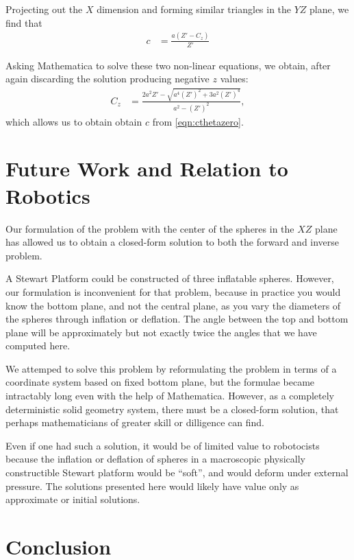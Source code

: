 \documentclass{article}
\begin{document}
Projecting out the $X$ dimension and forming
similar triangles in the $YZ$ plane, we find that
\begin{align}
  c &= \frac{a( Z' -C_z )}{Z'} \label{eqn:cthetazero}
\end{align}

Asking Mathematica to solve these two non-linear equations, we obtain,
after again discarding the solution producing negative $z$ values:
\begin{align}
 C_z &=  \frac{2 a^2 Z' - \sqrt{a^4 (Z')^2 + 3 a^2 (Z')^4}}{a^2 - (Z')^2},
\end{align}
which allows us to obtain obtain $c$ from \ref{eqn:cthetazero}.

\section{Future Work and Relation to Robotics}

Our formulation of the problem with the center of the spheres in the $XZ$
plane has allowed us to obtain a closed-form solution to both the forward
and inverse problem.

A Stewart Platform could be constructed of three inflatable spheres.
However, our formulation is inconvenient for that problem, because
in practice you would know the bottom plane, and not the central plane,
as you vary the diameters of the spheres through inflation or deflation.
The angle between the top and bottom plane will be approximately but not
exactly twice the angles that we have computed here.

We attemped to solve this problem by reformulating the problem in terms
of a coordinate system based on fixed bottom plane, but
the formulae became intractably long even with the help of Mathematica.
However, as a completely deterministic solid geometry system, there
must be a closed-form solution, that perhaps mathematicians of greater
skill or dilligence can find.

Even if one had such a solution, it would be of limited value
to robotocists because the inflation or deflation of spheres in
a macroscopic physically constructible Stewart platform would
be ``soft'', and would deform under external pressure. The solutions
presented here would likely have value only as approximate or initial
solutions.

\section{Conclusion}
\end{document}
